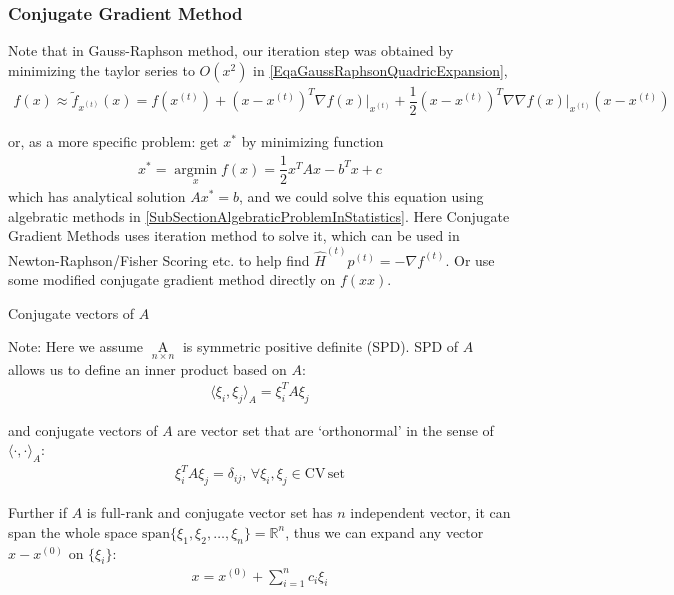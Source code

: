         
\subsubsection{Conjugate Gradient Method}
\hypertarget{ConjugateGradientMethod}{}
    Note that in Gauss-Raphson method, our iteration step was obtained by minimizing the taylor series to $ O(x^2)  $ in \autoref{EqaGaussRaphsonQuadricExpansion}, 
    \begin{align}
        f(x)\approx \tilde{f}_{x^{(t)}}(x)=f(x^{(t)})+(x-x^{(t)})^T\nabla \left. f(x)\right|_{x^{(t)}}+\dfrac{1}{2}(x-x^{(t)})^T\nabla\nabla \left. f(x) \right|_{x^{(t)}} (x-x^{(t)})
    \end{align}
    
    or, as a more specific problem: get $ x^* $ by minimizing function
    \begin{align}
        x^*=\mathop{\arg\min}\limits_{x} f(x)=\dfrac{1}{2}x^TAx-b^Tx+c 
    \end{align}
    which has analytical solution $ Ax^*=b $, and we could solve this equation using algebratic methods in \autoref{SubSectionAlgebraticProblemInStatistics}. Here Conjugate Gradient Methods uses iteration method to solve it, which can be used in Newton-Raphson/Fisher Scoring etc. to help find $ \hat{H}^{(t)}p^{(t)}=-\nabla f^{(t)} $. Or use some modified conjugate gradient method directly on $ f(xx) $.

\begin{point}
    Conjugate vectors of $ A $
\end{point} 

    Note: Here we assume $ \mathop{A}\limits_{n\times n}  $ is symmetric positive definite (SPD). SPD of $ A $ allows us to define an inner product based on $ A $:
    \begin{align}
        \langle \xi _i,\xi _j\rangle_A=\xi _i^TA\xi _j 
    \end{align}
    
    and conjugate vectors of $ A $ are vector set that are `orthonormal' in the sense of $ \langle\cdot,\cdot\rangle_A $:
    \begin{align}
        \xi ^T_iA\xi _j=\delta_{ij},\,\forall \xi _i,\xi _j\in \mathrm{CV\,set}  
    \end{align}
    
    Further if $ A $ is full-rank and conjugate vector set has $ n $ independent vector, it can span the whole space $ \mathrm{span}\{\xi _1,\xi _2,\ldots,\xi _n\}=\mathbb{R}^n   $, thus we can expand any vector $ x-x^{(0)} $ on $ \{\xi _i\} $:
    \begin{align}
        x=x^{(0)}+ \sum_{i=1}^nc_i\xi _i
    \end{align}
    
